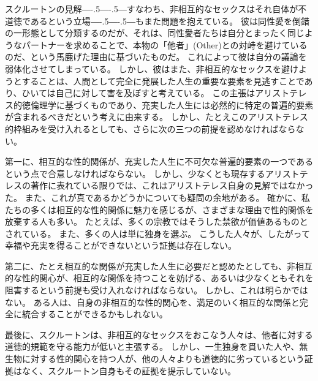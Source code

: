 \documentclass[paper=a4,book,openany]{jlreq}
\def\DDASH{―\kern-.5\zw―\kern-.5\zw―} %
\begin{document}
スクルートンの見解{\DDASH}すなわち、非相互的なセックスはそれ自体が不道徳であるという立場{\DDASH}もまた問題を抱えている。
彼は同性愛を倒錯の一形態として分類するのだが、それは、同性愛者たちは自分とまったく同じようなパートナーを求めることで、本物の「他者」(Other)との対峙を避けているのだ、という馬鹿げた理由に基づいたものだ。
これによって彼は自分の議論を弱体化させてしまっている。
しかし、彼はまた、非相互的なセックスを避けようとすることは、人間として完全に発展した人生の重要な要素を見逃すことであり、ひいては自己に対して害を及ぼすと考えている。
この主張はアリストテレス的徳倫理学に基づくものであり、充実した人生には必然的に特定の普遍的要素が含まれるべきだという考えに由来する。
しかし、たとえこのアリストテレス的枠組みを受け入れるとしても、さらに次の三つの前提を認めなければならない。

第一に、相互的な性的関係が、充実した人生に不可欠な普遍的要素の一つであるという点で合意しなければならない。
しかし、少なくとも現存するアリストテレスの著作に表れている限りでは、これはアリストテレス自身の見解ではなかった。
また、これが真であるかどうかについても疑問の余地がある。
確かに、私たちの多くは相互的な性的関係に魅力を感じるが、さまざまな理由で性的関係を放棄する人も多い。
たとえば、多くの宗教ではそうした禁欲が価値あるものとされている。
また、多くの人は単に独身を選ぶ。
こうした人々が、したがって幸福や充実を得ることができないという証拠は存在しない。

第二に、たとえ相互的な関係が充実した人生に必要だと認めたとしても、非相互的な性的関心が、相互的な関係を持つことを妨げる、あるいは少なくともそれを阻害するという前提も受け入れなければならない。
しかし、これは明らかではない。
ある人は、自身の非相互的な性的関心を、満足のいく相互的な関係と完全に統合することができるかもしれない。

最後に、スクルートンは、非相互的なセックスをおこなう人々は、他者に対する道徳的規範を守る能力が低いと主張する。
しかし、一生独身を貫いた人や、無生物に対する性的関心を持つ人が、他の人々よりも道徳的に劣っているという証拠はなく、スクルートン自身もその証拠を提示していない。
\end{document}
